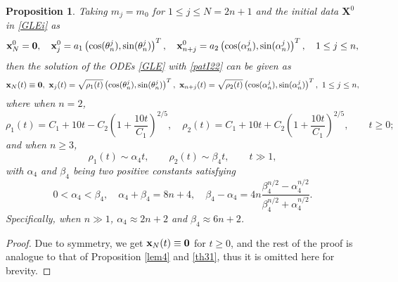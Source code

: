 \documentclass{aims}
\theoremstyle{plain}
\newtheorem{proposition}{Proposition}[section]
\theoremstyle{definition}
\newtheorem{remark}{Remark}[section]
\newcommand{\bx}{{\mathbf x}}
\newcommand{\bX}{{\mathbf X}}
\newcommand{\be} {\begin{equation}}
\newcommand{\ee}{\end{equation}}
\begin{document}
\begin{proposition}\label{lem8}
Taking $m_j=m_0$  for $1\le j\le N=2n+1$ and
the initial data $\bX^0$ in \eqref{GLEi} as
\be\label{patI22}
\bx_N^0={\bf 0}, \quad \mathbf x_j^0=a_1\left(\cos(\theta_n^j),\sin(\theta_n^j)\right)^T,\quad
\mathbf x_{n+j}^0=a_2\left(\cos(\alpha_n^j),\sin(\alpha_n^j)\right)^T,
\quad 1\le j\le n,
\ee
then the solution of the ODEs \eqref{GLE} with \eqref{patI22} can be given as
\be\label{solgle22}
\bx_N(t)\equiv {\bf 0},\ \mathbf x_j(t)=\sqrt{\rho_1(t)}\left(\cos(\theta_n^j),\sin(\theta_n^j)\right)^T,\
\mathbf x_{n+j}(t)=\sqrt{\rho_2(t)}\left(\cos(\alpha_n^j),\sin(\alpha_n^j)\right)^T,
\  1\le j\le n,
\ee
where when $n=2$,
\be
\rho_1(t)=C_1+10t-C_2\left(
1+\frac{10t}{C_1}\right)^{2/5},\quad \rho_2(t)=C_1+10t+C_2\left(
1+\frac{10t}{C_1}\right)^{2/5},\qquad
t\ge0; \nonumber
\ee
and when $n\ge3$,
\be
\rho_1(t)\sim \alpha_4 t,  \qquad \rho_2(t)\sim \beta_4 t, \qquad
t\gg 1, \nonumber
\ee
with $\alpha_4$ and $\beta_4$ being two positive constants
satisfying
\be \label{apb22}
0<\alpha_4< \beta_4, \quad \alpha_4+\beta_4=8n+4,\quad
\beta_4-\alpha_4=4n\frac{\beta_4^{n/2}-\alpha_4^{n/2}}
{\beta_4^{n/2}+\alpha_4^{n/2}}. \nonumber
\ee
Specifically, when $n\gg1$, $\alpha_4\approx 2n+2$ and  $\beta_4\approx 6n+2$.
\end{proposition}

\begin{proof}
Due to symmetry, we get $\bx_N(t)\equiv {\bf 0}$ for $t\ge0$, and the rest of the proof is analogue to that of Proposition \ref{lem4} and \ref{th31}, thus it is
omitted here for brevity.
\end{proof}

\end{document}
